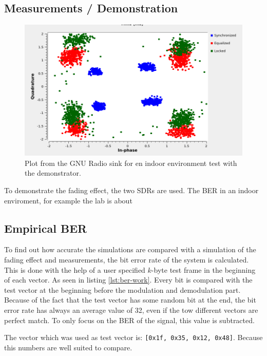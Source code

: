 \subsection{Measurements / Demonstration}

\begin{figure}
	\centering
	\includegraphics[frame, width = \linewidth]{figures/screenshots/Hardware_indoor.png}
	\caption{
		Plot from the GNU Radio sink for en indoor environment test with the demonstrator.
		\label{fig:GR-Hardware-indoor}
	}
\end{figure}
To demonstrate the fading effect, the two SDRs are used.
The BER in an indoor enviroment, for example the lab is about 


\subsection{Empirical BER} \label{sec:ber}
To find out how accurate the simulations are compared with a simulation of the fading effect and measurements, the bit error rate of the system is calculated. This is done with the help of a user specified \(k\)-byte test frame in the beginning of each vector. As seen in listing \ref{lst:ber-work}. Every bit is compared with the test vector at the beginning before the modulation and demodulation part. 
Because of the fact that the test vector has some random bit at the end, the bit error rate has always an average value of 32, even if the tow different vectors are  perfect match. To only focus on the BER of the signal, this value is subtracted. 

The vector which was used as test vector is: \texttt{[0x1f, 0x35, 0x12, 0x48]}. Because this numbers are well suited to compare.%


